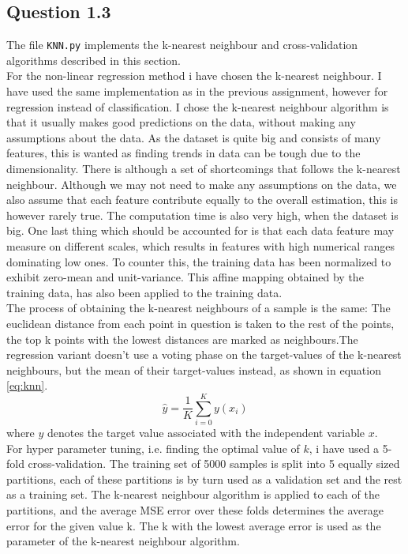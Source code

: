 \documentclass{article}
\begin{document}
\subsection{Question 1.3}
The file \texttt{KNN.py} implements the k-nearest neighbour and cross-validation algorithms described in this section.
\\
For the non-linear regression method i have chosen the k-nearest neighbour. I have used the same implementation as in the previous assignment, however for regression instead of classification.
I chose the k-nearest neighbour algorithm is that it usually makes good predictions on the data, without making any assumptions about the data. As the dataset is quite big and consists of many features, this is wanted as finding trends in data can be tough due to the dimensionality. There is although a set of shortcomings that follows the k-nearest neighbour. Although we may not need to make any assumptions on the data, we also assume that each feature contribute equally to the overall estimation, this is however rarely true. The computation time is also very high, when the dataset is big. One last thing which should be accounted for is that each data feature may measure on different scales, which results in features with high numerical ranges dominating low ones. To counter this, the training data has been normalized to exhibit zero-mean and unit-variance. This affine mapping obtained by the training data, has also been applied to the training data. \\
The process of obtaining the k-nearest neighbours of a sample is the same: The euclidean distance from each point in question is taken to the rest of the points, the top k points with the lowest distances are marked as neighbours.The regression variant doesn't use a voting phase 
on the target-values of the k-nearest neighbours, but the mean of their target-values instead, as shown in equation \eqref{eq:knn}.
\begin{equation}
\hat{y} =  \dfrac{1}{K} \sum\limits_{i=0}^K y(x_i)
\label{eq:knn}
\end{equation}
where $y$ denotes the target value associated with the independent variable $x$. \\
For hyper parameter tuning, i.e. finding the optimal value of $k$, i have used a 5-fold cross-validation. The training set of 5000 samples is split into 5 equally sized partitions, each of these partitions is by turn used as a validation set and the rest as a training set. The k-nearest neighbour algorithm is applied to each of the partitions, and the average MSE error over these folds determines the average error for the given value k. The k with the lowest average error is used as the parameter of the k-nearest neighbour algorithm.
\\
\end{document}
